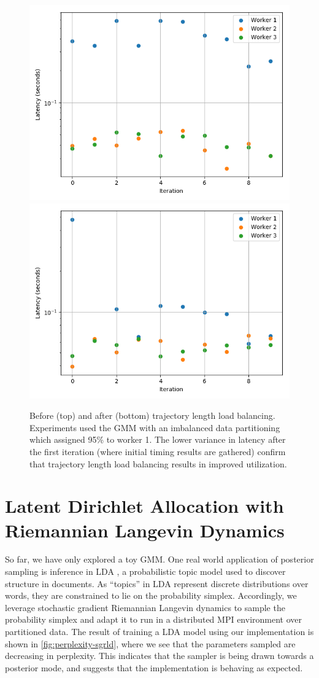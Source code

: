 \documentclass{article}
\begin{document}
\begin{figure}[htbp]
  \includegraphics[width=0.49\linewidth]{poster-figures/load-balancing-none.png}
  \includegraphics[width=0.49\linewidth]{poster-figures/load-balancing.png}
  \caption{Before (top) and after (bottom) trajectory length load balancing. Experiments used
    the GMM with an imbalanced data partitioning which assigned 95\% to worker 1. The lower variance
    in latency after the first iteration (where initial timing results are gathered)
    confirm that trajectory length load balancing results in improved
    utilization.}
  \label{fig:load-balancing}
\end{figure}

\section{Latent Dirichlet Allocation with Riemannian Langevin Dynamics}

So far, we have only explored a toy GMM. One real world application of posterior
sampling is inference in LDA \citep{blei2003latent}, a probabilistic topic model
used to discover structure in documents. As ``topics'' in LDA represent
discrete distributions over words, they are constrained to lie on the probability simplex.
Accordingly, we leverage stochastic gradient Riemannian Langevin dynamics \citep{patterson2013stochastic}
to sample the probability simplex and adapt it to run in a distributed MPI environment
over partitioned data. The result of training a LDA model using our implementation is shown in
\cref{fig:perplexity-sgrld}, where we see that the parameters sampled are decreasing in perplexity.
This indicates that the sampler is being drawn towards a posterior mode, and suggests that the implementation
is behaving as expected.
\end{document}
